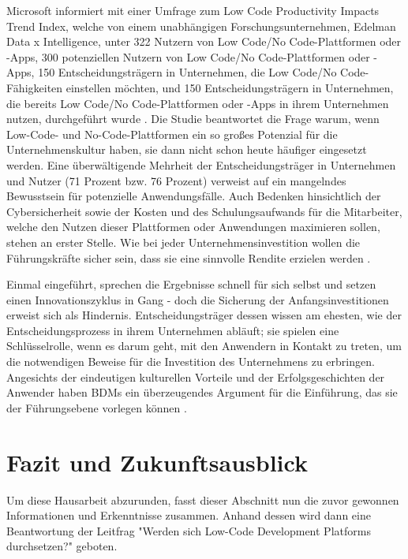 \documentclass[12pt]{article} %
\begin{document}
	Microsoft informiert mit einer Umfrage zum Low Code Productivity Impacts Trend Index, welche von einem unabhängigen Forschungsunternehmen, Edelman Data x Intelligence, unter 322 Nutzern von Low Code/No Code-Plattformen oder -Apps, 300 potenziellen Nutzern von Low Code/No Code-Plattformen oder -Apps, 150 Entscheidungsträgern in Unternehmen, die Low Code/No Code-Fähigkeiten einstellen möchten, und 150 Entscheidungsträgern in Unternehmen, die bereits Low Code/No Code-Plattformen oder -Apps in ihrem Unternehmen nutzen, durchgeführt wurde \cite{Microsoft.2022}. Die Studie beantwortet die Frage warum, wenn Low-Code- und No-Code-Plattformen ein so großes Potenzial für die Unternehmenskultur haben, sie dann nicht schon heute häufiger eingesetzt werden. Eine überwältigende Mehrheit der Entscheidungsträger in Unternehmen und Nutzer (71 Prozent bzw. 76 Prozent) verweist auf ein mangelndes Bewusstsein für potenzielle Anwendungsfälle. Auch Bedenken hinsichtlich der Cybersicherheit sowie der Kosten und des Schulungsaufwands für die Mitarbeiter, welche den Nutzen dieser Plattformen oder Anwendungen maximieren sollen, stehen an erster Stelle. Wie bei jeder Unternehmensinvestition wollen die Führungskräfte sicher sein, dass sie eine sinnvolle Rendite erzielen werden \cite{Microsoft.2022}.
	
	Einmal eingeführt, sprechen die Ergebnisse schnell für sich selbst und setzen einen Innovationszyklus in Gang - doch die Sicherung der Anfangsinvestitionen erweist sich als Hindernis. Entscheidungsträger dessen wissen am ehesten, wie der Entscheidungsprozess in ihrem Unternehmen abläuft; sie spielen eine Schlüsselrolle, wenn es darum geht, mit den Anwendern in Kontakt zu treten, um die notwendigen Beweise für die Investition des Unternehmens zu erbringen. Angesichts der eindeutigen kulturellen Vorteile und der Erfolgsgeschichten der Anwender haben BDMs ein überzeugendes Argument für die Einführung, das sie der Führungsebene vorlegen können \cite{Microsoft.2022}.
		
	
	\section{Fazit und Zukunftsausblick}
	Um diese Hausarbeit abzurunden, fasst dieser Abschnitt nun die zuvor gewonnen Informationen und Erkenntnisse zusammen. Anhand dessen wird dann eine Beantwortung der Leitfrag "Werden sich Low-Code Development Platforms durchsetzen?" geboten. \newline
	
\end{document}
